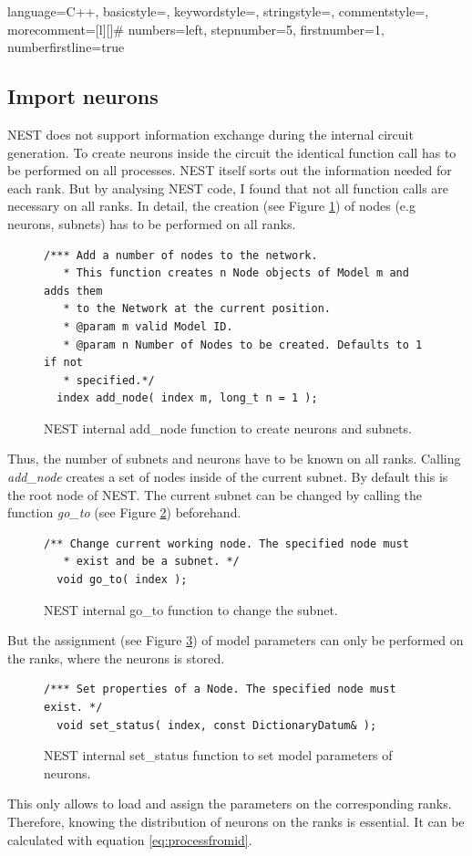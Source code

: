  {language=C++,
                basicstyle=\small\ttfamily,
                keywordstyle=\color{blue}\ttfamily,
                stringstyle=\color{red}\ttfamily,
                commentstyle=\color{green}\ttfamily,
                morecomment=[l][\color{magenta}]{\#}
                numbers=left,
  				stepnumber=5,    
  				firstnumber=1,
 				numberfirstline=true
}

\subsection{Import neurons}
NEST does not support information exchange during the internal circuit generation. 
To create neurons inside the circuit the identical function call has to be
performed on all processes. NEST itself sorts out the information needed for each rank.
But by analysing NEST code, I found that not all function calls are necessary on all ranks.
In detail, the creation (see Figure \ref{code:addnode}) of nodes (e.g neurons, subnets) has to be performed on all ranks.
\begin{figure}[ht!]
\begin{lstlisting}[style=cppcode]
/*** Add a number of nodes to the network.
   * This function creates n Node objects of Model m and adds them
   * to the Network at the current position.
   * @param m valid Model ID.
   * @param n Number of Nodes to be created. Defaults to 1 if not
   * specified.*/
  index add_node( index m, long_t n = 1 );
\end{lstlisting}
\caption{NEST internal add\_{}node function to create neurons and subnets.}
\label{code:addnode}
\end{figure}
Thus, the number of subnets and neurons have to be known on all ranks.
Calling \emph{add\_node} creates a set of nodes inside of the current subnet.
By default this is the root node of NEST.
The current subnet can be changed by calling the function \emph{go\_to} (see Figure \ref{code:goto}) beforehand.
\begin{figure}[ht!]
\begin{lstlisting}[style=cppcode]
/** Change current working node. The specified node must
   * exist and be a subnet. */
  void go_to( index );
\end{lstlisting}
\caption{NEST internal go\_{}to function to change the subnet.}
\label{code:goto}
\end{figure}
But the assignment (see Figure \ref{code:setstatus}) of model parameters can only be performed on the ranks,
where the neurons is stored.
\begin{figure}[ht!]
\begin{lstlisting}[style=cppcode]
/*** Set properties of a Node. The specified node must exist. */
  void set_status( index, const DictionaryDatum& );
\end{lstlisting}
\caption{NEST internal set\_{}status function to set model parameters of neurons.}
\label{code:setstatus}
\end{figure}
This only allows to load and assign the parameters on the corresponding ranks.
Therefore, knowing the distribution of neurons on the ranks is essential.
It can be calculated with equation \ref{eq:processfromid}.

